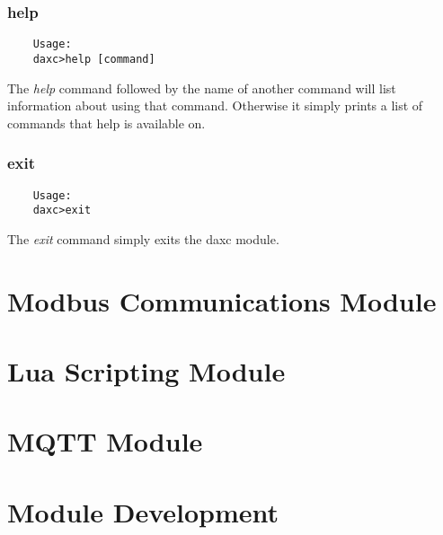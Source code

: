 	\subsection{help}
	\begin{verbatim}
	Usage:
	daxc>help [command]
	\end{verbatim}

	The \textit{help} command followed by the name of another command will list
	information about using that command. Otherwise it simply prints a list of
	commands that help is available on.

	\subsection{exit}
	\begin{verbatim}
	Usage:
	daxc>exit
	\end{verbatim}
	The \textit{exit} command simply exits the daxc module.

	\chapter{Modbus Communications Module}

	\chapter{Lua Scripting Module}
	

	\chapter{MQTT Module}
	

	\chapter{Module Development}



